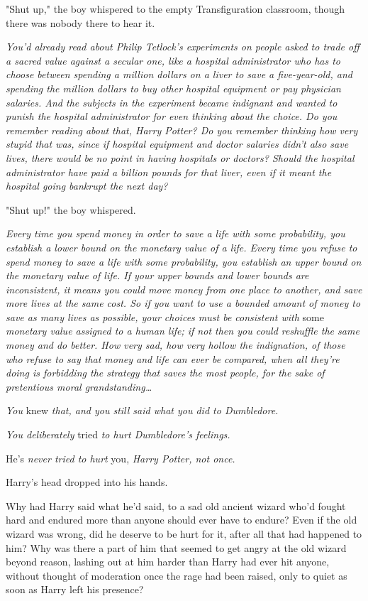 "Shut up," the boy whispered to the empty Transfiguration classroom, though 
there was nobody there to hear it.

\emph{You'd already read about Philip Tetlock's experiments on people asked to 
trade off a sacred value against a secular one, like a hospital administrator 
who has to choose between spending a million dollars on a liver to save a 
five-year-old, and spending the million dollars to buy other hospital equipment 
or pay physician salaries. And the subjects in the experiment became indignant 
and wanted to punish the hospital administrator for even thinking about the 
choice. Do you remember reading about that, Harry Potter? Do you remember 
thinking how very stupid that was, since if hospital equipment and doctor 
salaries didn't also save lives, there would be no point in having hospitals or 
doctors? Should the hospital administrator have paid a billion pounds for that 
liver, even if it meant the hospital going bankrupt the next day?}

"Shut up!" the boy whispered.

\emph{Every time you spend money in order to save a life with some probability, 
you establish a lower bound on the monetary value of a life. Every time you 
refuse to spend money to save a life with some probability, you establish an 
upper bound on the monetary value of life. If your upper bounds and lower 
bounds are inconsistent, it means you could move money from one place to 
another, and save more lives at the same cost. So if you want to use a bounded 
amount of money to save as many lives as possible, your choices must be 
consistent with} some\emph{ monetary value assigned to a human life; if not 
then you could reshuffle the same money and do better. How very sad, how very 
hollow the indignation, of those who refuse to say that money and life can ever 
be compared, when all they're doing is forbidding the strategy that saves the 
most people, for the sake of pretentious moral grandstanding{\ldots}}

\emph{You} knew\emph{ that, and you still said what you did to Dumbledore.}

\emph{You deliberately} tried\emph{ to hurt Dumbledore's feelings.}

He's\emph{ never tried to hurt} you,\emph{ Harry Potter, not once.} 

Harry's head dropped into his hands.

Why had Harry said what he'd said, to a sad old ancient wizard who'd fought 
hard and endured more than anyone should ever have to endure? Even if the old 
wizard was wrong, did he deserve to be hurt for it, after all that had happened 
to him? Why was there a part of him that seemed to get angry at the old wizard 
beyond reason, lashing out at him harder than Harry had ever hit anyone, 
without thought of moderation once the rage had been raised, only to quiet as 
soon as Harry left his presence?

